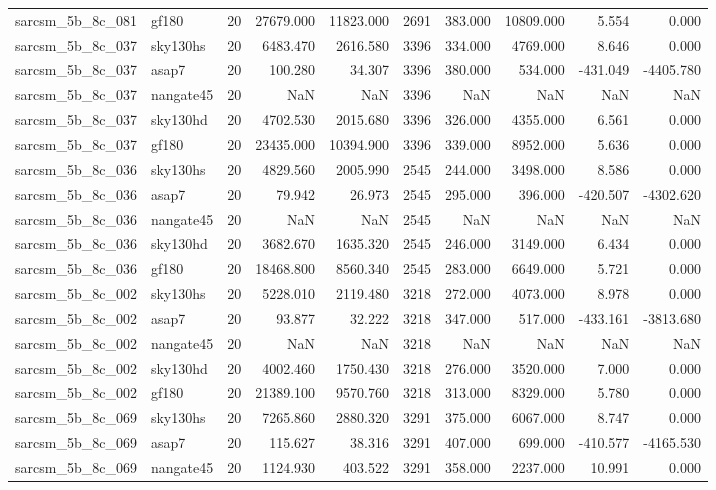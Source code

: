 \begin{longtable}{llrrrrrrrr}
sarcsm\_5b\_8c\_081 & gf180 & 20 & 27679.000 & 11823.000 & 2691 & 383.000 & 10809.000 & 5.554 & 0.000 \\
sarcsm\_5b\_8c\_037 & sky130hs & 20 & 6483.470 & 2616.580 & 3396 & 334.000 & 4769.000 & 8.646 & 0.000 \\
sarcsm\_5b\_8c\_037 & asap7 & 20 & 100.280 & 34.307 & 3396 & 380.000 & 534.000 & -431.049 & -4405.780 \\
sarcsm\_5b\_8c\_037 & nangate45 & 20 & NaN & NaN & 3396 & NaN & NaN & NaN & NaN \\
sarcsm\_5b\_8c\_037 & sky130hd & 20 & 4702.530 & 2015.680 & 3396 & 326.000 & 4355.000 & 6.561 & 0.000 \\
sarcsm\_5b\_8c\_037 & gf180 & 20 & 23435.000 & 10394.900 & 3396 & 339.000 & 8952.000 & 5.636 & 0.000 \\
sarcsm\_5b\_8c\_036 & sky130hs & 20 & 4829.560 & 2005.990 & 2545 & 244.000 & 3498.000 & 8.586 & 0.000 \\
sarcsm\_5b\_8c\_036 & asap7 & 20 & 79.942 & 26.973 & 2545 & 295.000 & 396.000 & -420.507 & -4302.620 \\
sarcsm\_5b\_8c\_036 & nangate45 & 20 & NaN & NaN & 2545 & NaN & NaN & NaN & NaN \\
sarcsm\_5b\_8c\_036 & sky130hd & 20 & 3682.670 & 1635.320 & 2545 & 246.000 & 3149.000 & 6.434 & 0.000 \\
sarcsm\_5b\_8c\_036 & gf180 & 20 & 18468.800 & 8560.340 & 2545 & 283.000 & 6649.000 & 5.721 & 0.000 \\
sarcsm\_5b\_8c\_002 & sky130hs & 20 & 5228.010 & 2119.480 & 3218 & 272.000 & 4073.000 & 8.978 & 0.000 \\
sarcsm\_5b\_8c\_002 & asap7 & 20 & 93.877 & 32.222 & 3218 & 347.000 & 517.000 & -433.161 & -3813.680 \\
sarcsm\_5b\_8c\_002 & nangate45 & 20 & NaN & NaN & 3218 & NaN & NaN & NaN & NaN \\
sarcsm\_5b\_8c\_002 & sky130hd & 20 & 4002.460 & 1750.430 & 3218 & 276.000 & 3520.000 & 7.000 & 0.000 \\
sarcsm\_5b\_8c\_002 & gf180 & 20 & 21389.100 & 9570.760 & 3218 & 313.000 & 8329.000 & 5.780 & 0.000 \\
sarcsm\_5b\_8c\_069 & sky130hs & 20 & 7265.860 & 2880.320 & 3291 & 375.000 & 6067.000 & 8.747 & 0.000 \\
sarcsm\_5b\_8c\_069 & asap7 & 20 & 115.627 & 38.316 & 3291 & 407.000 & 699.000 & -410.577 & -4165.530 \\
sarcsm\_5b\_8c\_069 & nangate45 & 20 & 1124.930 & 403.522 & 3291 & 358.000 & 2237.000 & 10.991 & 0.000 \\

\end{longtable}
